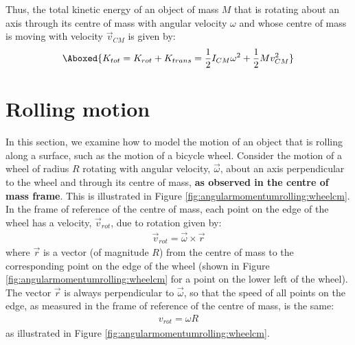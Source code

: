 Thus, the total kinetic energy of an object of mass $M$ that is rotating about an axis through its centre of mass with angular velocity $\omega$ and whose centre of mass is moving with velocity $\vec v_{CM}$ is given by:
\begin{align}
\Aboxed{K_{tot}=K_{rot}+K_{trans}=\frac{1}{2} I_{CM}\omega ^2 + \frac{1}{2}M v_{CM}^2} 
\end{align}


\section{Rolling motion}
In this section, we examine how to model the motion of an object that is rolling along a surface, such as the motion of a bicycle wheel. Consider the motion of a wheel of radius $R$ rotating with angular velocity, $\vec\omega$, about an axis perpendicular to the wheel and through its centre of mass, \textbf{as observed in the centre of mass frame}. This is illustrated in Figure \ref{fig:angularmomentumrolling:wheelcm}.
In the frame of reference of the centre of mass, each point on the edge of the wheel has a velocity, $\vec v_{rot}$, due to rotation given by:
\begin{align*}
\vec v_{rot} = \vec \omega\times \vec r 
\end{align*}
where $\vec r$ is a vector (of magnitude $R$) from the centre of mass to the corresponding point on the edge of the wheel (shown in Figure \ref{fig:angularmomentumrolling:wheelcm} for a point on the lower left of the wheel). The vector $\vec r$ is always perpendicular to $\vec \omega$, so that the speed of all points on the edge, as measured in the frame of reference of the centre of mass, is the same:
\begin{align}
\label{eq:angularmomentumrolling:vrot}
v_{rot} = \omega R
\end{align} 
as illustrated in Figure \ref{fig:angularmomentumrolling:wheelcm}.

